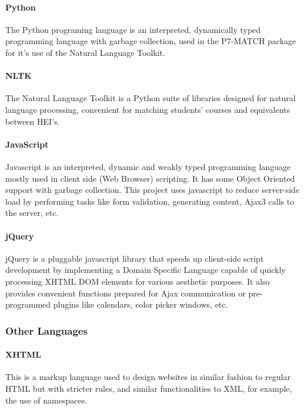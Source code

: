 \paragraph{Python}

The Python programing language is an interpreted, dynamically typed programming
language with garbage collection, used in the P7-MATCH package for it's use of
the Natural Language Toolkit.

\paragraph{NLTK}

The Natural Language Toolkit is a Python suite of libraries designed for natural
language processing, convenient for matching students' courses and equivalents
between HEI's.

\paragraph{JavaScript}

Javascript is an interpreted, dynamic and weakly typed programming language
mostly used in client side (Web Browser) scripting. It has some Object Oriented
support with garbage collection. This project uses javascript to reduce
server-side load by performing tasks like form validation, generating content,
Ajax3 calls to the server, etc.

\paragraph{jQuery}

jQuery is a pluggable javascript library that speeds up client-side script
development by implementing a Domain Specific Language capable of quickly
processing XHTML DOM elements for various aesthetic purposes. It also provides
convenient functions prepared for Ajax communication or pre-programmed plugins
like calendars, color picker windows, etc. 

\subsubsection{Other Languages}
 
\paragraph{XHTML}

This is a markup language used to design websites in similar fashion to regular
HTML but with stricter rules, and similar functionalities to XML, for example,
the use of namespaces. 

